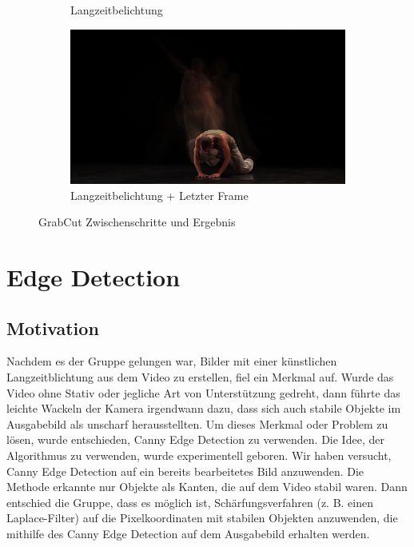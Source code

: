 \documentclass[12pt]{scrartcl}
\begin{document}
\begin{figure}[b]
\begin{subfigure}{0.5\linewidth}
		\caption{Langzeitbelichtung}
		\label{subfig:longexposure}
	\end{subfigure}
	\begin{subfigure}{0.5\linewidth}
		\includegraphics[width=\textwidth]{freeze_me_path.jpg}
		\caption{Langzeitbelichtung + Letzter Frame}
		\label{subfig:grabcutresult}
	\end{subfigure}
	\caption{GrabCut Zwischenschritte und Ergebnis}
	\label{fig:grabcutresultcomplex}
\end{figure}


\section{Edge Detection}
\subsection{Motivation}
Nachdem es der Gruppe gelungen war, Bilder mit einer k\"unstlichen Langzeitblichtung aus dem Video zu erstellen, fiel ein Merkmal auf. Wurde das Video ohne Stativ oder jegliche Art von Unterst\"utzung gedreht, dann f\"uhrte das leichte Wackeln der Kamera irgendwann dazu, dass sich auch stabile Objekte im Ausgabebild als unscharf herausstellten. Um dieses Merkmal oder Problem zu l\"osen, wurde entschieden, Canny Edge Detection zu verwenden.
Die Idee, der Algorithmus zu verwenden, wurde experimentell geboren. Wir haben versucht, Canny Edge Detection auf ein bereits bearbeitetes Bild anzuwenden. Die Methode erkannte nur Objekte als Kanten, die auf dem Video stabil waren. Dann entschied die Gruppe, dass es m\"oglich ist, Sch\"arfungsverfahren (z. B. einen Laplace-Filter) auf die Pixelkoordinaten mit stabilen Objekten anzuwenden, die mithilfe des Canny Edge Detection auf dem Ausgabebild erhalten werden.
\end{document}
